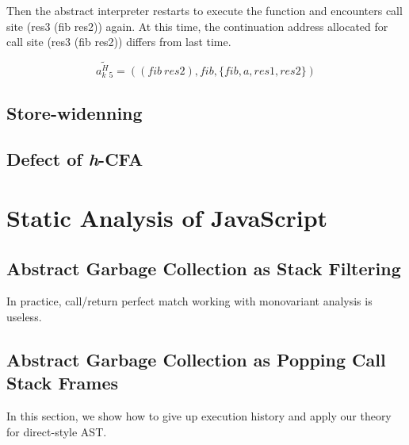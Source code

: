\documentclass{article}
\begin{document}
Then the abstract interpreter restarts to execute the function and encounters call site (res3 (fib res2)) again. At this time, the continuation address allocated for call site (res3 (fib res2)) differs from last time.

\[
\widetilde{a^H_k{}_5} = ((fib\ res2), fib, \{fib, a, res1, res2\})
\]

\subsection{Store-widenning}
\label{sub:Store-widenning}

\subsection{Defect of \textit{h}-CFA}
\label{sub:Defect of h-CFA}


\section{Static Analysis of JavaScript}
\label{sec:Static Analysis of JavaScript}
\subsection{Abstract Garbage Collection as Stack Filtering}
\label{sub:Abstract Garbage Collection as Stack Filtering}
In practice, call/return perfect match working with monovariant analysis is useless.
\subsection{Abstract Garbage Collection as Popping Call Stack Frames}
\label{sub:Abstract Garbage Collection as Popping Call Stack Frames}
In this section, we show how to give up execution history and apply our theory for direct-style AST\@.
\end{document}
